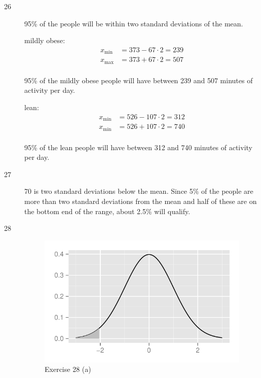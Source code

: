 \documentclass[letterpaper, landscape]{exam}
\begin{document}
    \begin{description}
      \item[26] 95\% of the people will be within two standard deviations of
        the mean.  

        mildly obese:
        \begin{align*}
          x_{\min} &= 373 - 67 \cdot 2 = 239 \\
          x_{\max} &= 373 + 67 \cdot 2 = 507 \\
        \end{align*}

        95\% of the mildly obese people will have between 239 and 507 minutes of activity
        per day.

        lean:
        \begin{align*}
          x_{\min} &= 526 - 107 \cdot 2 = 312 \\
          x_{\min} &= 526 + 107 \cdot 2 = 740 \\
        \end{align*}

        95\% of the lean people will have between 312 and 740 minutes of activity per day.

      \item[27]
        70 is two standard deviations below the mean.  Since 5\% of the people are more
        than two standard deviations from the mean and half of these are on the bottom end
        of the range, about 2.5\% will qualify. 

      \item[28]

        \begin{figure}[H]
          \centering
          \includegraphics{figures/ex28a.pdf}
          \caption{Exercise 28 (a)}
        \end{figure}


\end{description}
\end{document}
